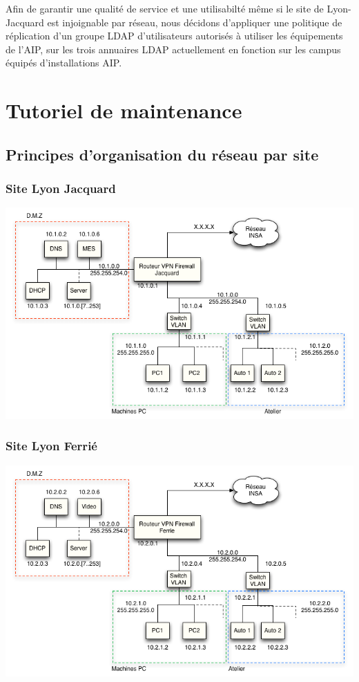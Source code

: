 \documentclass[a4paper]{article}
\begin{document}
Afin de garantir une qualité de service et une utilisabilté même si le site de Lyon-Jacquard est injoignable par réseau, nous décidons d'appliquer une politique de réplication d'un groupe LDAP d'utilisateurs autorisés à utiliser les équipements de l'AIP, sur les trois annuaires LDAP actuellement en fonction sur les campus équipés d'installations AIP.

\section{Tutoriel de maintenance}

\subsection{Principes d'organisation du réseau par site}

\subsubsection{Site Lyon Jacquard}

\begin{center}
\includegraphics[scale=0.6]{SiteJacquard.png}
\end{center}

\subsubsection{Site Lyon Ferrié}

\begin{center}
\includegraphics[scale=0.6]{SiteFerrie.png}
\end{center}
\end{document}
